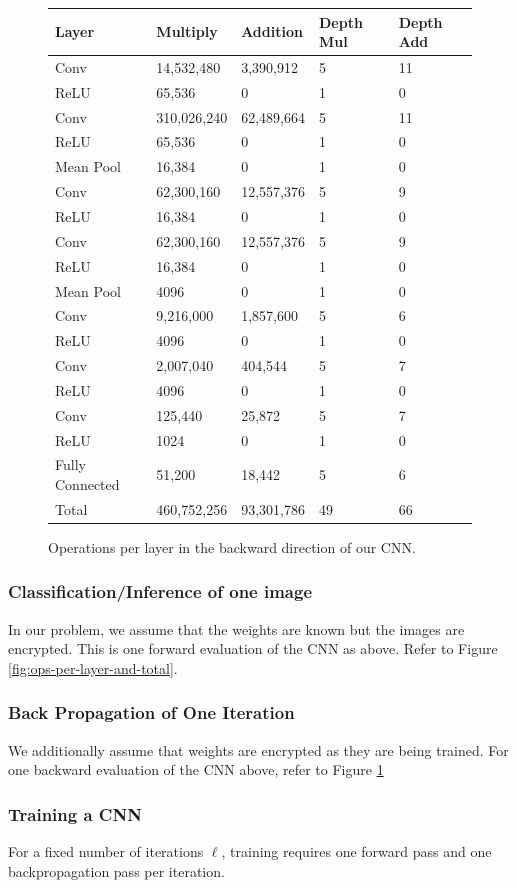 \begin{figure}[h]
\begin{tabular}{ m{9em} | m{7em} m{7em} m{5em} m{5em} }
Layer & Multiply & Addition & Depth Mul & Depth Add \\ \hline
Conv & 14,532,480 & 3,390,912	& 5	& 11 \\
ReLU & 65,536	&	0	&	1	&	0 \\
Conv & 310,026,240&	62,489,664	&5&	11 \\
ReLU & 65,536	&	0	&	1	&	0\\
Mean Pool & 16,384 &0	&	1	&	0\\
Conv & 62,300,160 &	12,557,376	 &5	 & 9\\
ReLU & 16,384	&	0	&	1	&	0\\
Conv & 62,300,160 &	12,557,376 &	5	& 9 \\
ReLU & 16,384	&	0	&	1	&	0 \\
Mean Pool & 4096	& 0	&	1	&	0 \\
Conv & 9,216,000 &	1,857,600&	5&	6\\
ReLU & 4096	&	0	&	1&	0\\
Conv & 2,007,040	& 404,544&	5&	7\\
ReLU & 4096	&0	&	1	&	0\\
Conv & 125,440		&25,872	 &5	&7 \\
ReLU & 1024	&	0&	1&	0 \\
Fully Connected & 51,200	& 18,442& 	5&	6 \\ \hline
Total & 460,752,256	&	93,301,786&	49&	66
\end{tabular}


\caption{Operations per layer in the backward direction of our CNN.}
\label{fig:ops-per-backwards-layer-and-total}
\end{figure}


\subsubsection{Classification/Inference of one image} 
In our problem, we assume that the weights are known but the images are encrypted. 
This is one forward evaluation of the CNN as above. 
Refer to Figure \ref{fig:ops-per-layer-and-total}.

\subsubsection{Back Propagation of One Iteration}
We additionally assume that weights are encrypted as they are being trained.
For one backward evaluation of the CNN above, refer to
Figure \ref{fig:ops-per-backwards-layer-and-total}


\subsubsection{Training a CNN}
For a fixed number of iterations $\ell$,
training requires one forward pass and one backpropagation pass per iteration.
